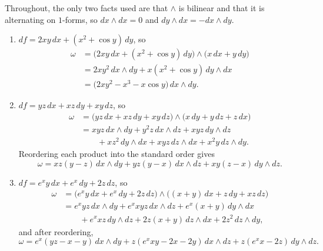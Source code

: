 \begin{exercisesolution}
\label{sol:serra_df_wedge_lambda}
Throughout, the only two facts used are that $\wedge$ is bilinear and that it is alternating on
$1$-forms, so $dx\wedge dx = 0$ and $dy\wedge dx = -dx\wedge dy$.

\begin{enumerate}[label=\textbf{(\alph*)}]
  \item $df = 2xy\,dx + (x^2+\cos y)\,dy$, so
    \begin{align*}
      \omega &= \big(2xy\,dx + (x^2+\cos y)\,dy\big)\wedge\big(x\,dx + y\,dy\big) \\
             &= 2xy^2\,dx\wedge dy + x(x^2+\cos y)\,dy\wedge dx \\
             &= \big(2xy^2 - x^3 - x\cos y\big)\,dx\wedge dy.
    \end{align*}

  \item $df = yz\,dx + xz\,dy + xy\,dz$, so
    \begin{align*}
      \omega &= \big(yz\,dx + xz\,dy + xy\,dz\big)\wedge\big(x\,dy + y\,dz + z\,dx\big) \\
             &= xyz\,dx\wedge dy + y^2z\,dx\wedge dz + xyz\,dy\wedge dz \\
             &\qquad + xz^2\,dy\wedge dx + xyz\,dz\wedge dx + x^2y\,dz\wedge dy.
    \end{align*}
    Reordering each product into the standard order gives
    \[\omega = xz(y-z)\,dx\wedge dy + yz(y-x)\,dx\wedge dz + xy(z-x)\,dy\wedge dz.\]

  \item $df = e^xy\,dx + e^x\,dy + 2z\,dz$, so
    \begin{align*}
      \omega &= \big(e^xy\,dx + e^x\,dy + 2z\,dz\big)\wedge\big((x+y)\,dx + z\,dy + xz\,dz\big) \\
             &= e^xyz\,dx\wedge dy + e^xxyz\,dx\wedge dz + e^x(x+y)\,dy\wedge dx \\
             &\qquad + e^xxz\,dy\wedge dz + 2z(x+y)\,dz\wedge dx + 2z^2\,dz\wedge dy,
    \end{align*}
    and after reordering,
    \[\omega = e^x(yz-x-y)\,dx\wedge dy + z(e^xxy-2x-2y)\,dx\wedge dz + z(e^xx-2z)\,dy\wedge dz.\]


\end{enumerate}
\end{exercisesolution}
